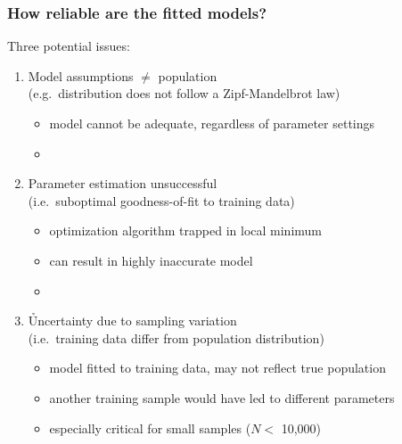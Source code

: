 \documentclass[handout,notes=show,t]{beamer} %
\begin{document}
\begin{frame}
  \frametitle{How reliable are the fitted models?}
  
  Three potential issues:
  \begin{enumerate}
  \item Model assumptions $\neq$ population\\
    (e.g.\ distribution does not follow a Zipf-Mandelbrot law)
    \begin{itemize}
    \item[\hand] model cannot be adequate, regardless of parameter settings
    \item[]
    \end{itemize}
  \item Parameter estimation unsuccessful\\
    (i.e.\ suboptimal goodness-of-fit to training data)
    \begin{itemize}
    \item[\hand] optimization algorithm trapped in local minimum
    \item[\hand] can result in highly inaccurate model
    \item[]
    \end{itemize}
  \item \h{Uncertainty due to sampling variation}\\
    (i.e.\ training data differ from population distribution)
    \begin{itemize}
    \item[\hand] model fitted to training data, may not reflect true population
    \item[\hand] another training sample would have led to different parameters
    \item[\hand] especially critical for small samples ($N < $ 10,000)
    \end{itemize}
  \end{enumerate}
\end{frame}
\end{document}
